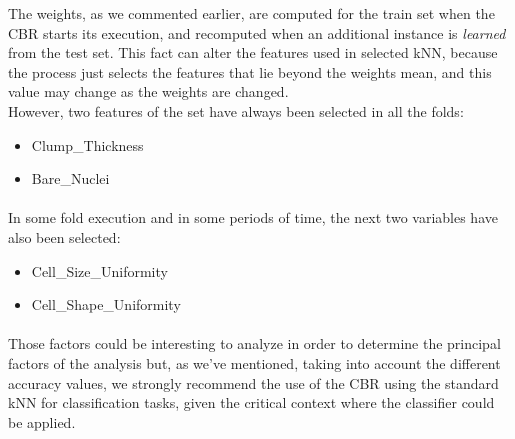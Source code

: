 \documentclass[12pt, a4paper]{article}
\begin{document}
The weights, as we commented earlier, are computed for the train set when the CBR starts its execution, and recomputed when an additional instance is \emph{learned} from the test set. This fact can alter the features used in selected kNN, because the process just selects the features that lie beyond the weights mean, and this value may change as the weights are changed.\\

However, two features of the set have always been selected in all the folds:
\begin{itemize}
	\item Clump\_Thickness
	\item Bare\_Nuclei
\end{itemize}
\paragraph{}In some fold execution and in some periods of time, the next two variables have also been selected:
\begin{itemize}
	\item Cell\_Size\_Uniformity
	\item Cell\_Shape\_Uniformity
\end{itemize}
\paragraph{}Those factors could be interesting to analyze in order to determine the principal factors of the analysis but, as we’ve mentioned, taking into account the different accuracy values, we strongly recommend the use of the CBR using the standard kNN for classification tasks, given the critical context where the classifier could be applied.


\end{document}
